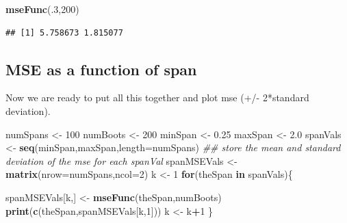 \documentclass[]{article}
\newenvironment{Shaded}{\begin{snugshade}}{\end{snugshade}}
\newcommand{\CommentTok}[1]{\textcolor[rgb]{0.56,0.35,0.01}{\textit{#1}}}
\newcommand{\ControlFlowTok}[1]{\textcolor[rgb]{0.13,0.29,0.53}{\textbf{#1}}}
\newcommand{\DataTypeTok}[1]{\textcolor[rgb]{0.13,0.29,0.53}{#1}}
\newcommand{\DecValTok}[1]{\textcolor[rgb]{0.00,0.00,0.81}{#1}}
\newcommand{\FloatTok}[1]{\textcolor[rgb]{0.00,0.00,0.81}{#1}}
\newcommand{\KeywordTok}[1]{\textcolor[rgb]{0.13,0.29,0.53}{\textbf{#1}}}
\newcommand{\NormalTok}[1]{#1}
\newcommand{\OperatorTok}[1]{\textcolor[rgb]{0.81,0.36,0.00}{\textbf{#1}}}
\newcommand{\StringTok}[1]{\textcolor[rgb]{0.31,0.60,0.02}{#1}}
\begin{document}
\begin{Shaded}
\begin{Highlighting}[]
\KeywordTok{mseFunc}\NormalTok{(.}\DecValTok{3}\NormalTok{,}\DecValTok{200}\NormalTok{)}
\end{Highlighting}
\end{Shaded}

\begin{verbatim}
## [1] 5.758673 1.815077
\end{verbatim}

\hypertarget{mse-as-a-function-of-span}{%
\subsection{MSE as a function of span}\label{mse-as-a-function-of-span}}

Now we are ready to put all this together and plot mse (+/- 2*standard
deviation).

\begin{Shaded}
\begin{Highlighting}[]
\NormalTok{numSpans <-}\StringTok{ }\DecValTok{100}
\NormalTok{numBoots <-}\StringTok{ }\DecValTok{200}
\NormalTok{minSpan <-}\StringTok{ }\FloatTok{0.25}
\NormalTok{maxSpan <-}\StringTok{ }\FloatTok{2.0}
\NormalTok{spanVals <-}\StringTok{ }\KeywordTok{seq}\NormalTok{(minSpan,maxSpan,}\DataTypeTok{length=}\NormalTok{numSpans)}
\CommentTok{## store the mean and standard deviation of the mse for each spanVal}
\NormalTok{spanMSEVals <-}\StringTok{ }\KeywordTok{matrix}\NormalTok{(}\DataTypeTok{nrow=}\NormalTok{numSpans,}\DataTypeTok{ncol=}\DecValTok{2}\NormalTok{)}
\NormalTok{k <-}\StringTok{ }\DecValTok{1}
\ControlFlowTok{for}\NormalTok{(theSpan }\ControlFlowTok{in}\NormalTok{ spanVals)\{}
  
\NormalTok{  spanMSEVals[k,] <-}\StringTok{ }\KeywordTok{mseFunc}\NormalTok{(theSpan,numBoots)}
  \KeywordTok{print}\NormalTok{(}\KeywordTok{c}\NormalTok{(theSpan,spanMSEVals[k,}\DecValTok{1}\NormalTok{]))}
\NormalTok{  k <-}\StringTok{ }\NormalTok{k}\OperatorTok{+}\DecValTok{1}
\NormalTok{\}}
\end{Highlighting}
\end{Shaded}
\end{document}
